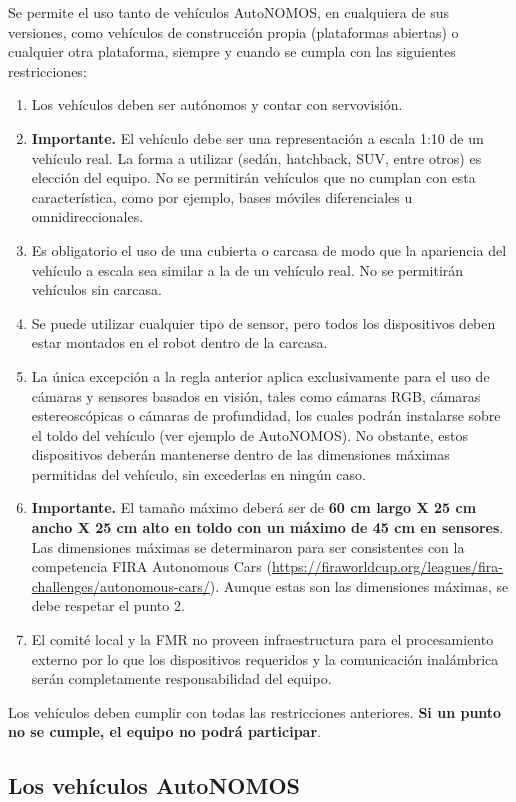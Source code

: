 \documentclass[letterpaper,12pt]{article}
\begin{document}
Se permite el uso tanto de vehículos AutoNOMOS, en cualquiera de sus versiones, como vehículos de construcción propia (plataformas abiertas) o cualquier otra plataforma, siempre y cuando se cumpla con las siguientes restricciones:
\begin{enumerate}
\item Los vehículos deben ser autónomos y contar con servovisión.
\item \textbf{Importante. } El vehículo debe ser una representación a escala 1:10 de un vehículo real. La forma a utilizar (sedán, hatchback, SUV, entre otros) es elección del equipo. No se permitirán vehículos que no cumplan con esta característica, como por ejemplo, bases móviles diferenciales u omnidireccionales.
\item Es obligatorio el uso de una cubierta o carcasa de modo que la apariencia del vehículo a escala sea similar a la de un vehículo real. No se permitirán vehículos sin carcasa.
\item Se puede utilizar cualquier tipo de sensor, pero todos los dispositivos deben estar montados en el robot dentro de la carcasa.
\item La única excepción a la regla anterior aplica exclusivamente para el uso de cámaras y sensores basados en visión, tales como cámaras RGB, cámaras estereoscópicas o cámaras de profundidad, los cuales podrán instalarse sobre el toldo del vehículo (ver ejemplo de AutoNOMOS). No obstante, estos dispositivos deberán mantenerse dentro de las dimensiones máximas permitidas del vehículo, sin excederlas en ningún caso. 
\item \textbf{Importante.} El tamaño máximo deberá ser de \textbf{60 cm largo X 25 cm ancho X 25 cm alto en toldo con un máximo de 45 cm en sensores}. Las dimensiones máximas se determinaron para ser consistentes con la competencia FIRA Autonomous Cars (\url{https://firaworldcup.org/leagues/fira-challenges/autonomous-cars/}). Aunque estas son las dimensiones máximas, se debe respetar el punto 2. 

\item El comité local y la FMR no proveen infraestructura para el procesamiento externo por lo que los dispositivos requeridos y la comunicación inalámbrica serán completamente responsabilidad del equipo.
\end{enumerate}
Los vehículos deben cumplir con todas las restricciones anteriores. \textbf{Si un punto no se cumple, el equipo no podrá participar}.

\subsection{Los vehículos AutoNOMOS}
\end{document}
